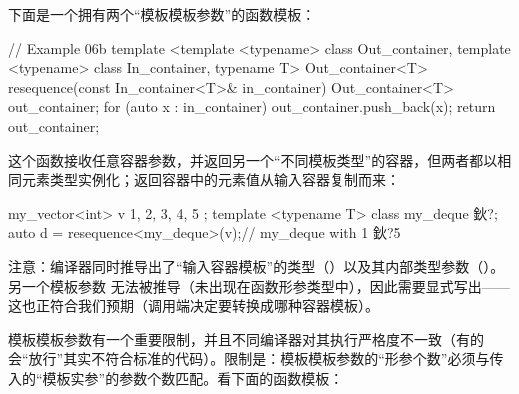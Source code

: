 下面是一个拥有两个“模板模板参数”的函数模板：

\begin{code}
// Example 06b
template <template <typename> class Out_container,
          template <typename> class In_container,
          typename T> Out_container<T>
resequence(const In_container<T>& in_container) {
  Out_container<T> out_container;
  for (auto x : in_container) {
    out_container.push_back(x);
  }
  return out_container;
}
\end{code}

这个函数接收任意容器参数，并返回另一个“不同模板类型”的容器，但两者都以相同元素类型实例化；返回容器中的元素值从输入容器复制而来：

\begin{code}
my_vector<int> v { 1, 2, 3, 4, 5 };
template <typename T> class my_deque { 鈥?};
auto d = resequence<my_deque>(v);// my_deque with 1 鈥?5
\end{code}

注意：编译器同时推导出了“输入容器模板”的类型（）以及其内部类型参数（）。另一个模板参数  无法被推导（未出现在函数形参类型中），因此需要显式写出——这也正符合我们预期（调用端决定要转换成哪种容器模板）。

模板模板参数有一个重要限制，并且不同编译器对其执行严格度不一致（有的会“放行”其实不符合标准的代码）。限制是：模板模板参数的“形参个数”必须与传入的“模板实参”的参数个数匹配。看下面的函数模板：

